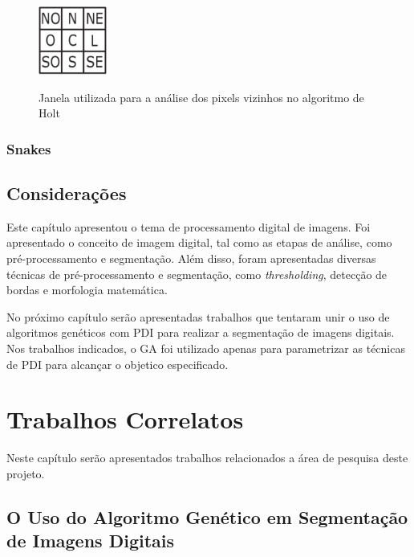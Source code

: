 \documentclass[12pt,oneside,a4paper,english,french,spanish,brazil,]{abntex2}
\begin{document}
\begin{figure}[ht]
\centering
\caption{Janela utilizada para a análise dos pixels vizinhos no algoritmo de Holt}
\includegraphics[width=0.2\textwidth]{imagens/PDI_Holt_1.PNG}
\label{fig:PDI_Holt_1}
\end{figure}

\subsection{Snakes}

\section{Considerações}

Este capítulo apresentou o tema de processamento digital de imagens. Foi apresentado o conceito de imagem digital, tal como as etapas de análise, como pré-processamento e segmentação. Além disso, foram apresentadas diversas técnicas de pré-processamento e segmentação, como \textit{thresholding}, detecção de bordas e morfologia matemática.

No próximo capítulo serão apresentadas trabalhos que tentaram unir o uso de algoritmos genéticos com PDI para realizar a segmentação de imagens digitais. Nos trabalhos indicados, o GA foi utilizado apenas para parametrizar as técnicas de PDI para alcançar o objetico especificado.

\chapter{Trabalhos Correlatos}
\label{chap:TrabalhosCorrelatos}

Neste capítulo serão apresentados trabalhos relacionados a área de pesquisa deste projeto.


\section{O Uso do Algoritmo Genético em Segmentação de Imagens Digitais}
\end{document}
